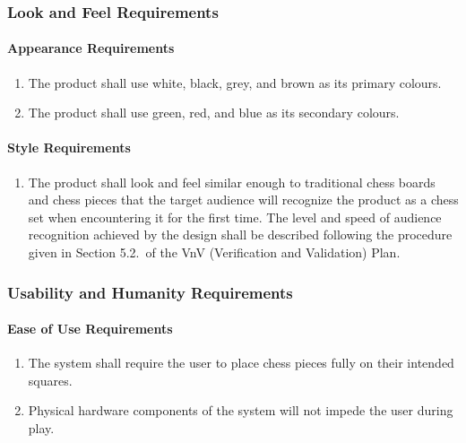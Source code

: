 \documentclass[12pt]{article}
\begin{document}
{
\setcounter{vnvSectionNfr}{1}

\setcounter{nfrNum}{1}

\subsubsection{Look and Feel Requirements}
\label{NFR_LF}
\paragraph{Appearance Requirements}
\begin{enumerate}[{LF}1., leftmargin=2\parindent]
    \item The product shall use white, black, grey, and brown as its primary colours.
    \item The product shall use green, red, and blue as its secondary colours.
\end{enumerate}

\paragraph{Style Requirements}
\begin{enumerate}[{LF}1., leftmargin=2\parindent, resume]
    \item The product shall look and feel similar enough to traditional chess boards and chess pieces that the target audience will 
    recognize the product as a chess set when encountering it for the first time. The level and speed of audience recognition achieved 
    by the design shall be described following the procedure given in Section 5.2.\thevnvSectionNfr{}~of the VnV 
    (Verification and Validation) Plan.
\end{enumerate}



\subsubsection{Usability and Humanity Requirements}
\label{NFR_UH}
\paragraph{Ease of Use Requirements}
\begin{enumerate}[{UH}1., leftmargin=2\parindent]
    \item The system shall require the user to place chess pieces fully on their intended squares.
    \item Physical hardware components of the system will not impede the user during play.
\end{enumerate}

}
\end{document}
